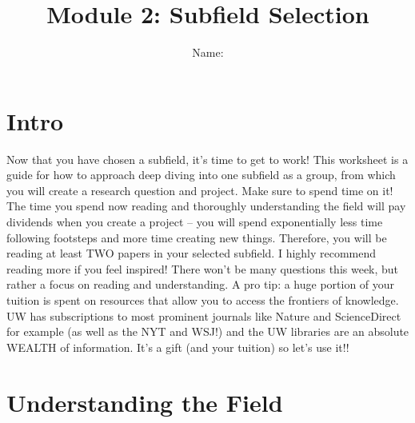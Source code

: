 \documentclass[letterpaper,11pt]{article}
\begin{document}
\title{{\bf Module 2: Subfield Selection} }
\author{Name: }

\date{}
\maketitle

\section{Intro}
Now that you have chosen a subfield, it's time to get to work! This worksheet is a guide for how to approach deep diving into one subfield as a group, from which you will create a research question and project. Make sure to spend time on it! The time you spend now reading and thoroughly understanding the field will pay dividends when you create a project -- you will spend exponentially less time following footsteps and more time creating new things. Therefore, you will be reading at least TWO papers in your selected subfield. I highly recommend reading more if you feel inspired!
\newline
\newline
There won't be many questions this week, but rather a focus on reading and understanding. A pro tip: a huge portion of your tuition is spent on resources that allow you to access the frontiers of knowledge. UW has subscriptions to most prominent journals like Nature and ScienceDirect for example (as well as the NYT and WSJ!) and the UW libraries are an absolute WEALTH of information. It's a gift (and your tuition) so let's use it!!
\section{Understanding the Field}
\end{document}
